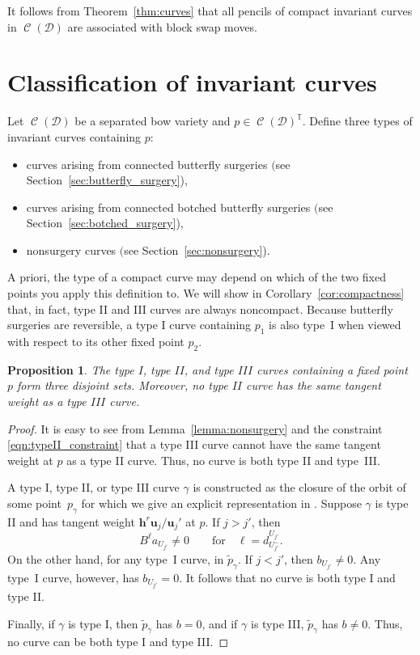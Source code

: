 \documentclass[11pt]{article}
\numberwithin{equation}{section}
\newtheorem{Proposition}[Theorem]{Proposition}
 { \theoremstyle{definition}
\newtheorem{Definition}[Theorem]{Definition}
\newtheorem{Note}[Theorem]{Note}
\newtheorem{Example}[Theorem]{Example}
\newtheorem{Remark}[Theorem]{Remark} }
\newcommand{\brane}{\mathcal D}
\newcommand{\torus}{\mathbb T}
\newcommand{\MM}{\mathbb M}
\newcommand{\hb}{\mathbf h}
\newcommand{\ub}{\mathbf u}
\newcommand{\prequot}{\widetilde \MM^s}
\DeclareMathOperator{\bowvar}{\mathcal C}
\begin{document}
It follows from Theorem~\ref{thm:curves} that all pencils of compact invariant curves in $\bowvar(\brane)$ are associated with block swap moves.


\section{Classification of invariant curves} \label{sec:classification}
\begin{Definition}
Let $\bowvar(\brane)$ be a separated bow variety and $p\in\bowvar(\brane)^\torus$. Define three types of invariant curves containing $p$:
\begin{itemize}\itemsep=0pt
\item[$\rm I)$] curves arising from connected butterfly surgeries $($see Section~{\rm\ref{sec:butterfly_surgery})},
\item[$\rm II)$] curves arising from connected botched butterfly surgeries $($see Section~{\rm\ref{sec:botched_surgery})},
\item[$\rm III)$] nonsurgery curves $($see Section~{\rm\ref{sec:nonsurgery})}.
\end{itemize}
\end{Definition}
A priori, the type of a compact curve may depend on which of the two fixed points you apply this definition to. We will show in Corollary~\ref{cor:compactness} that, in fact, type II and III curves are always noncompact. Because butterfly surgeries are reversible, a type I curve containing $p_1$ is also type~I when viewed with respect to its other fixed point $p_2$.

\begin{Proposition} \label{prop:disjoint_types}
The type $I$, type $II$, and type $III$ curves containing a fixed point $p$ form three disjoint sets. Moreover, no type $II$ curve has the same tangent weight as a type $III$ curve.
\end{Proposition}

\begin{proof}
It is easy to see from Lemma~\ref{lemma:nonsurgery} and the constraint \eqref{eqn:typeII_constraint} that a type III curve cannot have the same tangent weight at $p$ as a type II curve. Thus, no curve is both type II and type~III.

A type I, type II, or type III curve $\gamma$ is constructed as the closure of the orbit of some point~$p_\gamma$ for which we give an explicit representation in \smash{$\tilde{p}_\gamma \in \prequot$}. Suppose $\gamma$ is type II and has tangent weight $\hb^r \ub_j/\ub_j'$ at $p$. If $j > j'$, then
\[
B^\ell a_{U_{j'}} \neq 0 \qquad \text{for} \quad \ell = d_{U_{j'}^-}^{U_{j'}}.
\]
On the other hand, for any type~I curve,  in $\tilde{p}_\gamma$. If $j < j'$, then $b_{U_{j'}} \neq 0$. Any type~I curve, however, has $b_{U_{j'}} = 0$. It follows that no curve is both type I and type II.

Finally, if $\gamma$ is type I, then $\tilde{p}_\gamma$ has $b=0$, and if $\gamma$ is type III, $\tilde{p}_\gamma$ has $b\neq 0$. Thus, no curve can be both type I and type III.
\end{proof}
\end{document}
